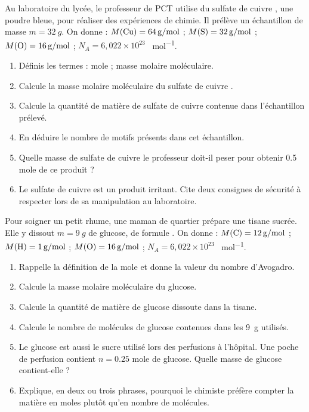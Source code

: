 \documentclass[11pt]{article}
\newcounter{popsec}
\newcounter{popsub}
\newcommand{\courssub}[1]{%
  \stepcounter{popsub}%
  \par\vspace{9pt}\noindent{\popxbold\fontsize{11.5}{13}\selectfont\color{popink}{\color{poporange}\thepopsec.\thepopsub}\hspace{6pt}#1}\par\nopagebreak\vspace{4pt}
}
\begin{document}
\courssub{Je me prépare au BEPC}

\begin{exercice}
Au laboratoire du lycée, le professeur de PCT utilise du sulfate de cuivre , une poudre bleue, pour réaliser des expériences de chimie. Il prélève un échantillon de masse $m = \SI{32}{g}$.
On donne : $M(\ce{Cu}) = \SI{64}{g/mol}$ ; $M(\ce{S}) = \SI{32}{g/mol}$ ; $M(\ce{O}) = \SI{16}{g/mol}$ ; $N_A = 6,022\times 10^{23}$ \SI{}{mol^{-1}}.
\begin{enumerate}
\item Définis les termes : mole ; masse molaire moléculaire.
\item Calcule la masse molaire moléculaire du sulfate de cuivre .
\item Calcule la quantité de matière de sulfate de cuivre contenue dans l'échantillon prélevé.
\item En déduire le nombre de motifs  présents dans cet échantillon.
\item Quelle masse de sulfate de cuivre le professeur doit-il peser pour obtenir \num{0,5} mole de ce produit ?
\item Le sulfate de cuivre est un produit irritant. Cite deux consignes de sécurité à respecter lors de sa manipulation au laboratoire.
\end{enumerate}
\end{exercice}

\begin{exercice}
Pour soigner un petit rhume, une maman de quartier prépare une tisane sucrée. Elle y dissout $m = \SI{9}{g}$ de glucose, de formule .
On donne : $M(\ce{C}) = \SI{12}{g/mol}$ ; $M(\ce{H}) = \SI{1}{g/mol}$ ; $M(\ce{O}) = \SI{16}{g/mol}$ ; $N_A = 6,022\times 10^{23}$ \SI{}{mol^{-1}}.
\begin{enumerate}
\item Rappelle la définition de la mole et donne la valeur du nombre d'Avogadro.
\item Calcule la masse molaire moléculaire du glucose.
\item Calcule la quantité de matière de glucose dissoute dans la tisane.
\item Calcule le nombre de molécules de glucose contenues dans les \SI{9}{g} utilisés.
\item Le glucose est aussi le sucre utilisé lors des perfusions à l'hôpital. Une poche de perfusion contient $n = \num{0,25}$ mole de glucose. Quelle masse de glucose contient-elle ?
\item Explique, en deux ou trois phrases, pourquoi le chimiste préfère compter la matière en moles plutôt qu'en nombre de molécules.
\end{enumerate}
\end{exercice}
\end{document}
